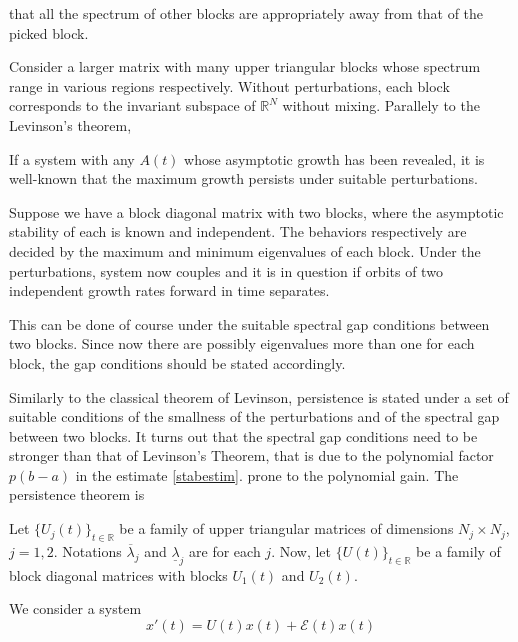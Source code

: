 \documentclass[a4paper,11pt]{article}
\def\blue{\color{blue}}
\newcommand{\upl}{\overline{\lambda}}
\newcommand{\udl}{\underline{\lambda}}
\newcommand{\E}{\mathcal{E}}
\newcounter{Theorem}
\newtheorem{lemma}{Lemma}[section]
\theoremstyle{remark}
\begin{document}
that all the spectrum of other blocks are appropriately away from that of the picked block. 



Consider a larger matrix  with many upper triangular blocks whose spectrum range in various regions respectively. Without perturbations, each block corresponds to the invariant subspace of $\mathbb{R}^N$ without mixing. Parallely to the Levinson's theorem, 


If a system with any $A(t)$ whose asymptotic  growth has been revealed, it is well-known that the maximum growth persists under suitable perturbations.




Suppose we have a block diagonal matrix with two blocks, where the asymptotic stability of each is known and independent. The behaviors respectively are decided by the maximum and minimum eigenvalues of each block. Under the perturbations, system now couples and it is in question if orbits of two independent growth rates forward in time separates.

This can be done of course under the suitable spectral gap conditions between two blocks. Since now there are possibly eigenvalues more than one for each block, the gap conditions should be stated accordingly.

{\blue
Similarly to the classical theorem of Levinson, persistence is stated under a set of suitable conditions of the smallness of the perturbations and of the spectral gap between two blocks. It turns out that the spectral gap conditions need to be stronger than that of Levinson's Theorem, that is due to the polynomial factor $p(b-a)$ in the estimate \eqref{stabestim}. prone to the polynomial gain.
}
The persistence theorem is 

Let $\{U_j(t)\}_{t\in \mathbb{R}}$ be a family of upper triangular matrices of dimensions $N_j \times N_j$, $j=1,2$. Notations $\upl_j$ and $\udl_j$ are for each $j$. Now, let $\{U(t)\}_{t\in \mathbb{R}}$ be a family of block diagonal matrices with blocks $U_1(t)$ and $U_2(t)$.

We consider a system
\begin{equation}
 x'(t) = U(t)x(t) + \E(t)x(t)
\end{equation}
\end{document}
